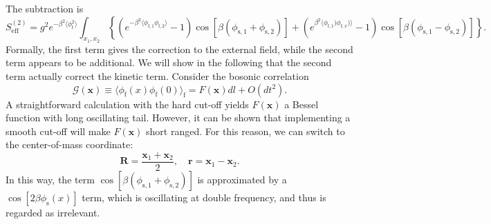 \documentclass[aps,prb,superscriptaddress,nofootinbib]{revtex4}
\begin{document}
The subtraction is
\begin{equation}
	S^{(2)}_{\mathrm{eff}}
	= g^2 e^{-\beta^2\langle\phi_{\mathrm{f}}^2\rangle} \int_{x_1,x_2}  \left\{
		\left(e^{-\beta^2 \langle\phi_{\mathrm{f},1}\phi_{\mathrm{f},2}\rangle}-1 \right)\cos\left[\beta(\phi_{\mathrm{s},1} +\phi_{\mathrm{s},2})\right] 
	 + \left(e^{\beta^2 \langle\phi_{\mathrm{f},1})\phi_{\mathrm{f},x})\rangle}-1 \right)\cos\left[\beta(\phi_{\mathrm{s},1} -\phi_{\mathrm{s},2})\right] \right\}.
\end{equation}
Formally, the first term gives the correction to the external field, while the second term appears to be additional.
We will show in the following that the second term actually correct the kinetic term.
Consider the bosonic correlation
\begin{equation}
	\mathcal G(\bm x) \equiv \langle \phi_{\mathrm{f}}(x) \phi_{\mathrm{f}}(0)\rangle_{\mathrm{f}} = F(\bm x) dl + O(dt^2).
\end{equation}
A straightforward calculation with the hard cut-off yields $F(\bm x)$ a Bessel function with long oscillating tail.
However, it can be shown that implementing a smooth cut-off will make $F(\bm x)$ short ranged.
For this reason, we can switch to the center-of-mass coordinate:
\begin{equation}
	\bm R = \frac{\bm x_1 + \bm x_2}{2}, \quad \bm r = \bm x_1 - \bm x_2.
\end{equation}
In this way, the term $\cos\left[\beta(\phi_{\mathrm{s},1}+\phi_{\mathrm{s},2})\right]$ is approximated by a $\cos\left[2\beta\phi_{\mathrm{s}}(x)\right]$ term, which is oscillating at double frequency, and thus is regarded as irrelevant.
\end{document}
